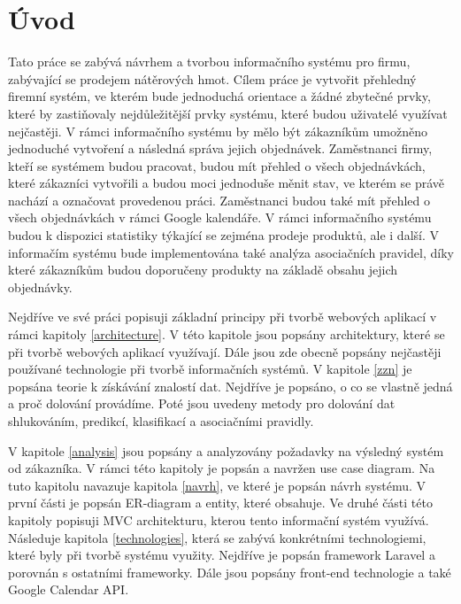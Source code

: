 
\chapter{Úvod}

Tato práce se zabývá návrhem a tvorbou informačního systému pro firmu, zabývající se prodejem nátěrových hmot. Cílem práce je vytvořit přehledný firemní systém, ve kterém bude jednoduchá orientace a žádné zbytečné prvky, které by zastiňovaly nejdůležitější prvky systému, které budou uživatelé využívat nejčastěji. V rámci informačního systému by mělo být zákazníkům umožněno jednoduché vytvoření a následná správa jejich objednávek. Zaměstnanci firmy, kteří se systémem budou pracovat, budou mít přehled o všech objednávkách, které zákazníci vytvořili a budou moci jednoduše měnit stav, ve kterém se právě nachází a označovat provedenou práci. Zaměstnanci budou také mít přehled o všech objednávkách v rámci Google kalendáře. V rámci informačního systému budou k dispozici statistiky týkající se zejména prodeje produktů, ale i další. V informačím systému bude implementována také analýza asociačních pravidel, díky které zákazníkům budou doporučeny produkty na základě obsahu jejich objednávky.

Nejdříve ve své práci popisuji základní principy při tvorbě webových aplikací v rámci kapitoly \ref{architecture}. V této kapitole jsou popsány architektury, které se při tvorbě webových aplikací využívají. Dále jsou zde obecně popsány nejčastěji používané technologie při tvorbě informačních systémů. V kapitole \ref{zzn} je popsána teorie k získávání znalostí dat. Nejdříve je popsáno, o co se vlastně jedná a proč dolování provádíme. Poté jsou uvedeny metody pro dolování dat shlukováním, predikcí, klasifikací a asociačními pravidly.

V kapitole \ref{analysis} jsou popsány a analyzovány požadavky na výsledný systém od zákazníka. V rámci této kapitoly je popsán a navržen use case diagram. Na tuto kapitolu navazuje kapitola \ref{navrh}, ve které je popsán návrh systému. V první části je popsán ER-diagram a entity, které obsahuje. Ve druhé části této kapitoly popisuji MVC architekturu, kterou tento informační systém využívá.  Následuje kapitola \ref{technologies}, která se zabývá konkrétními technologiemi, které byly při tvorbě systému využity. Nejdříve je popsán framework Laravel a porovnán s ostatními frameworky. Dále jsou popsány front-end technologie a také Google Calendar API.

